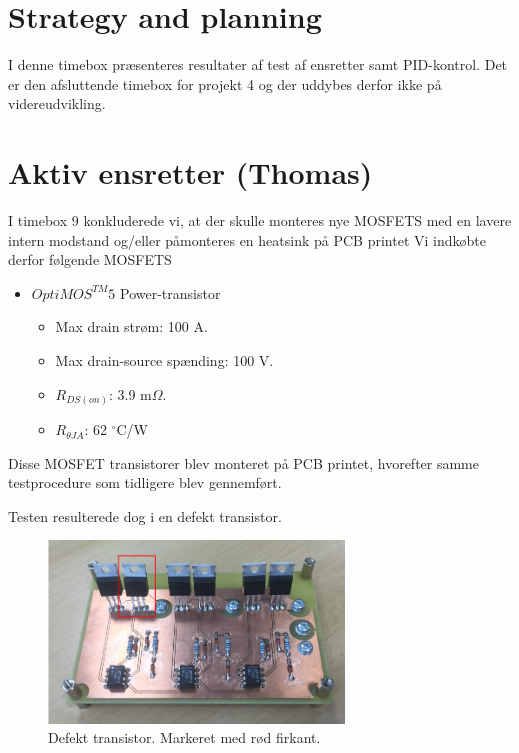 
\section{Strategy and planning}
\label{sec:strat-plann-jacob}

I denne timebox præsenteres resultater af test af ensretter samt PID-kontrol. Det er den afsluttende timebox for projekt 4 og der uddybes derfor ikke på videreudvikling.


\section{Aktiv ensretter (Thomas)}
\label{sec:aktiv-ensretter}

I timebox 9 konkluderede vi, at der skulle monteres nye MOSFETS med en lavere intern modstand og/eller påmonteres en heatsink på PCB printet Vi indkøbte derfor følgende MOSFETS

\begin{itemize}
\item $OptiMOS^{TM}5$ Power-transistor
  \begin{itemize}
  \item Max drain strøm: 100 A.
  \item Max drain-source spænding: 100 V.
  \item $R_{DS(on)}$: 3.9 m$\Omega$.
  \item $R_{\theta JA}$: 62 $^\circ$C/W
  \end{itemize}
\end{itemize}

Disse MOSFET transistorer blev monteret på PCB printet, hvorefter samme testprocedure som tidligere blev gennemført.  

Testen resulterede dog i en defekt transistor.

\begin{figure}[h]
  \centering
  \includegraphics[width=0.7\textwidth]{nt8.png}
  \caption{Defekt transistor. Markeret med rød firkant.}
  \label{fig:nt8}
\end{figure}

